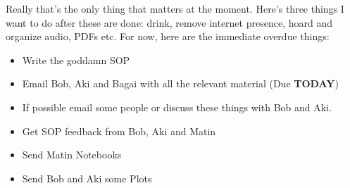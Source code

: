 \noindent {}

Really that's the only thing that matters at the moment. Here's three things I want to do after these are done: drink, remove internet presence, hoard and organize audio, PDFs etc. For now, here are the immediate overdue things:
\begin{itemize}
    \item Write the goddamn SOP
    \item Email Bob, Aki and Bagai with all the relevant material (Due \textbf{TODAY})
    \item If possible email some people or discuss these things with Bob and Aki. 
    \item Get SOP feedback from Bob, Aki and Matin
    \item Send Matin Notebooks
    \item Send Bob and Aki some Plots
\end{itemize}
